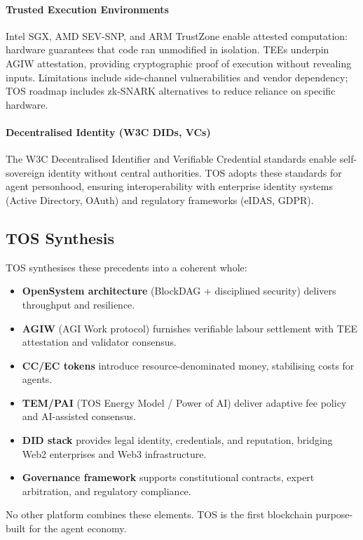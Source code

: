\documentclass[11pt]{article}
\begin{document}
\paragraph{Trusted Execution Environments} Intel SGX, AMD SEV-SNP, and ARM TrustZone enable attested computation: hardware guarantees that code ran unmodified in isolation. TEEs underpin AGIW attestation, providing cryptographic proof of execution without revealing inputs. Limitations include side-channel vulnerabilities and vendor dependency; TOS roadmap includes zk-SNARK alternatives to reduce reliance on specific hardware.

\paragraph{Decentralised Identity (W3C DIDs, VCs)} The W3C Decentralised Identifier and Verifiable Credential standards enable self-sovereign identity without central authorities. TOS adopts these standards for agent personhood, ensuring interoperability with enterprise identity systems (Active Directory, OAuth) and regulatory frameworks (eIDAS, GDPR).

\subsection{TOS Synthesis}
TOS synthesises these precedents into a coherent whole:
\begin{itemize}[noitemsep]
  \item \textbf{OpenSystem architecture} (BlockDAG + disciplined security) delivers throughput and resilience.
  \item \textbf{AGIW} (AGI Work protocol) furnishes verifiable labour settlement with TEE attestation and validator consensus.
  \item \textbf{CC/EC tokens} introduce resource-denominated money, stabilising costs for agents.
  \item \textbf{TEM/PAI} (TOS Energy Model / Power of AI) deliver adaptive fee policy and AI-assisted consensus.
  \item \textbf{DID stack} provides legal identity, credentials, and reputation, bridging Web2 enterprises and Web3 infrastructure.
  \item \textbf{Governance framework} supports constitutional contracts, expert arbitration, and regulatory compliance.
\end{itemize}

No other platform combines these elements. TOS is the first blockchain purpose-built for the agent economy.
\end{document}
